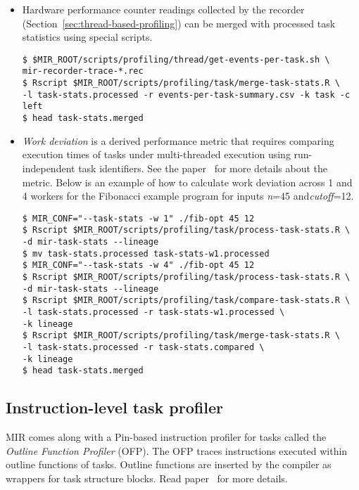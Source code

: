 \documentclass[11pt,a4paper]{article}
\begin{document}
\begin{itemize}
    \item Hardware performance counter readings collected by the recorder (Section~\ref{sec:thread-based-profiling}) can be merged with processed task statistics using special scripts.

\begin{lstlisting}[style=MyInputStyle]
$ $MIR_ROOT/scripts/profiling/thread/get-events-per-task.sh \
mir-recorder-trace-*.rec
$ Rscript $MIR_ROOT/scripts/profiling/task/merge-task-stats.R \
-l task-stats.processed -r events-per-task-summary.csv -k task -c left
$ head task-stats.merged
\end{lstlisting}

    \item \textit{Work deviation} is a derived performance metric that requires comparing execution times of tasks under multi-threaded execution using run-independent task identifiers. See the paper~\cite{muddukrishna2015grain} for more details about the metric. Below is an example of how to calculate work deviation across 1 and 4 workers for the Fibonacci example program for inputs \textit{n}=45 and\textit{cutoff}=12.

\begin{lstlisting}[style=MyInputStyle]
$ MIR_CONF="--task-stats -w 1" ./fib-opt 45 12
$ Rscript $MIR_ROOT/scripts/profiling/task/process-task-stats.R \
-d mir-task-stats --lineage
$ mv task-stats.processed task-stats-w1.processed
$ MIR_CONF="--task-stats -w 4" ./fib-opt 45 12
$ Rscript $MIR_ROOT/scripts/profiling/task/process-task-stats.R \
-d mir-task-stats --lineage
$ Rscript $MIR_ROOT/scripts/profiling/task/compare-task-stats.R \
-l task-stats.processed -r task-stats-w1.processed \
-k lineage
$ Rscript $MIR_ROOT/scripts/profiling/task/merge-task-stats.R \
-l task-stats.processed -r task-stats.compared \
-k lineage
$ head task-stats.merged
\end{lstlisting}
\end{itemize}

\subsection{Instruction-level task profiler}\label{sec:instruction-level-task-profiling}

MIR comes along with a Pin-based instruction profiler for tasks called the \textit{Outline Function Profiler} (OFP).
The OFP traces instructions executed within outline functions of tasks.
Outline functions are inserted by the compiler as wrappers for task structure blocks.
Read paper~\cite{muddukrishna2015characterizing} for more details.
\end{document}
